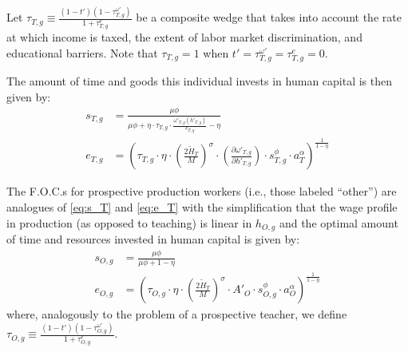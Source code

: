 \documentclass[onehalfspacing,11pt]{article}
\begin{document}
	Let $\tau_{T,g} \equiv \frac{\left( 1-t' \right) \left( 1-\tau^{\omega '}_{T,g} \right)}{1+\tau^e_{T,g}}$ be a composite wedge that takes into account the rate at which income is taxed, the extent of labor market discrimination, and educational barriers. Note that $\tau_{T,g}=1$ when $t' = \tau^{\omega '}_{T,g} = \tau^e_{T,g} = 0$.
	
	The amount of time and goods this individual invests in human capital is then given by:
	\begin{align}
		\label{eq:s_T}
		s_{T,g} & = \frac{\mu \phi}{\mu \phi+\eta \cdot \tau_{T,g} \cdot \tfrac{\omega'_{T,g}(h'_{T,g})}{e_{T,g}}-\eta}\\
		\label{eq:e_T}
		e_{T,g} & = \left( \tau_{T,g}\cdot \eta \cdot\left(\tfrac{2 \widetilde{H}_T}{M}\right)^\sigma \cdot\left(\tfrac{\partial \omega'_{T,g}}{\partial h'_{T,g}}\right) \cdot s_{T,g}^\phi \cdot a_T^\alpha \right)^{\frac{1}{1-\eta}}
	\end{align}
	
	
	The F.O.C.s for prospective production workers (i.e., those labeled ``other'') are analogues of \eqref{eq:s_T} and \eqref{eq:e_T} with the simplification that the wage profile in production (as opposed to teaching) is linear in $h_{O,g}$ and the optimal amount of time and resources invested in human capital is given by:
	\begin{align}
		s_{O,g} & = \frac{\mu \phi}{\mu \phi+1-\eta} \\
		\label{eq:e_O}
		e_{O,g} & = \left( \tau_{O,g} \cdot \eta \cdot \left(\tfrac{2\widetilde{H}_T}{M}\right)^\sigma\cdot {A'_{O}} \cdot s_{O,g}^\phi \cdot a_O^\alpha \right)^{\frac{1}{1-\eta}}
	\end{align}
	where, analogously to the problem of a prospective teacher, we define $\tau_{O,g} \equiv \frac{\left( 1-t' \right) \left( 1-\tau^{\omega '}_{O,g} \right)}{1+\tau^e_{O,g}}$.
	
\end{document}
